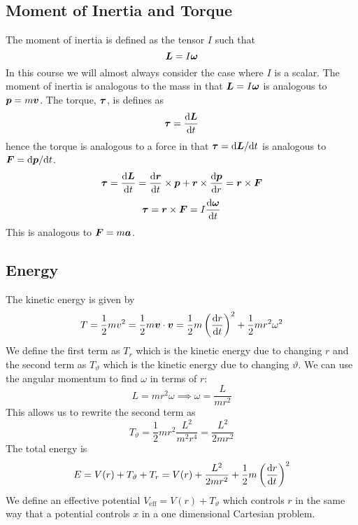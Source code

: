 \documentclass{article}
\begin{document}
    \subsection{Moment of Inertia and Torque}
    The moment of inertia is defined as the tensor \(I\) such that
    \[\bm{L} = I\bm{\omega}\]
    In this course we will almost always consider the case where \(I\) is a scalar.
    The moment of inertia is analogous to the mass in that \(\bm{L} = I\bm{\omega}\) is analogous to \(\bm{p} = m\bm{v}\).
    The torque, \(\bm{\tau}\), is defines as
    \[\bm{\tau} = \dv{\bm{L}}{t}\]
    hence the torque is analogous to a force in that \(\bm{\tau} = \dd\bm{L}/\dd t\) is analogous to \(\bm{F} = \dd\bm{p}/\dd t\).
    \[\bm{\tau} = \dv{\bm{L}}{t} = \dv{\bm{r}}{t}\times\bm{p} + \bm{r}\times\dv{\bm{p}}{r} = \bm{r}\times\bm{F}\]
    \[\bm{\tau} = \bm{r}\times\bm{F} = I\dv{\bm{\omega}}{t}\]
    This is analogous to \(\bm{F} = m\bm{a}\).
    
    \subsection{Energy}
    The kinetic energy is given by
    \[T = \frac{1}{2}mv^2 = \frac{1}{2}m\bm{v}\cdot\bm{v} = \frac{1}{2}m\left(\dv{r}{t}\right)^2 + \frac{1}{2}mr^2\omega^2\]
    We define the first term as \(T_r\) which is the kinetic energy due to changing \(r\) and the second term as \(T_\vartheta\) which is the kinetic energy due to changing \(\vartheta\).
    We can use the angular momentum to find \(\omega\) in terms of \(r\):
    \[L = mr^2\omega\implies \omega = \frac{L}{mr^2}\]
    This allows us to rewrite the second term as
    \[T_\vartheta = \frac{1}{2}mr^2\frac{L^2}{m^2r^4} = \frac{L^2}{2mr^2}\]
    The total energy is
    \[E = V(r) + T_\vartheta + T_r = V(r) + \frac{L^2}{2mr^2} + \frac{1}{2}m\left(\dv{r}{t}\right)^2\]
    We define an effective potential \(V_\text{eff} = V(r) + T_\vartheta\) which controls \(r\) in the same way that a potential controls \(x\) in a one dimensional Cartesian problem.
    
\end{document}

